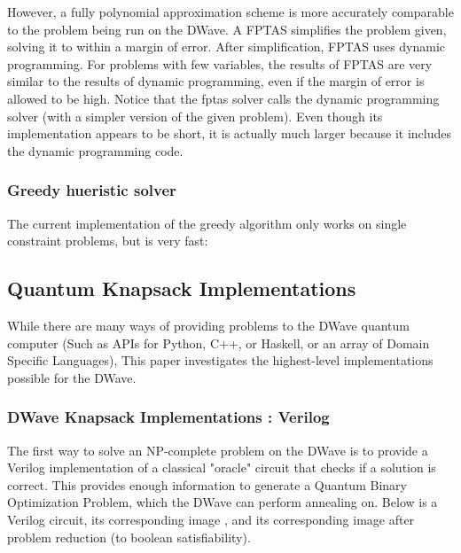 \documentclass{article}
\begin{document}
However, a fully polynomial approximation scheme is more accurately comparable to the problem being run on the DWave.
A FPTAS simplifies the problem given, solving it to within a margin of error.
After simplification, FPTAS uses dynamic programming.
For problems with few variables, the results of FPTAS are very similar to the results of dynamic programming, even if the margin of error is allowed to be high.
Notice that the fptas solver calls the dynamic programming solver (with a simpler version of the given problem). Even though its implementation appears to be short, it is actually much larger because it includes the dynamic programming code.

\lstset{language=Python}

\newpage

\subsubsection{Greedy hueristic solver}

The current implementation of the greedy algorithm only works on single constraint problems, but is very fast:

\lstset{language=Python}

\newpage

\subsection{Quantum Knapsack Implementations}

While there are many ways of providing problems to the DWave quantum computer (Such as APIs for Python, C++, or Haskell, or an array of Domain Specific Languages), This paper investigates the highest-level implementations possible for the DWave.

\subsubsection{DWave Knapsack Implementations : Verilog}

The first way to solve an NP-complete problem on the DWave is to provide a Verilog implementation of a classical "oracle" circuit that checks if a solution is correct.
This provides enough information to generate a Quantum Binary Optimization Problem, which the DWave can perform annealing on.
Below is a Verilog circuit, its corresponding image , and its corresponding image after problem reduction (to boolean satisfiability).
\end{document}
